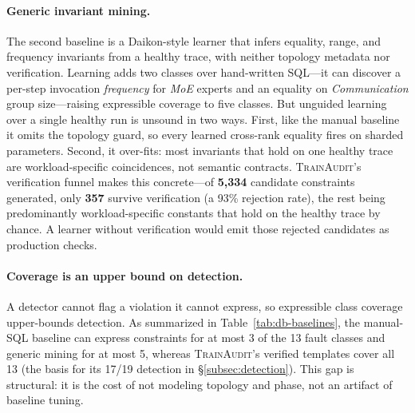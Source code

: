 \paragraph{Generic invariant mining.} The second baseline is a Daikon-style learner that infers equality, range, and frequency invariants from a healthy trace, with neither topology metadata nor verification. Learning adds two classes over hand-written SQL---it can discover a per-step invocation \emph{frequency} for \emph{MoE} experts and an equality on \emph{Communication} group size---raising expressible coverage to five classes. But unguided learning over a single healthy run is unsound in two ways. First, like the manual baseline it omits the topology guard, so every learned cross-rank equality fires on sharded parameters. Second, it over-fits: most invariants that hold on one healthy trace are workload-specific coincidences, not semantic contracts. \textsc{TrainAudit}'s verification funnel makes this concrete---of \textbf{5{,}334} candidate constraints generated, only \textbf{357} survive verification (a 93\% rejection rate), the rest being predominantly workload-specific constants that hold on the healthy trace by chance. A learner without verification would emit those rejected candidates as production checks.

\paragraph{Coverage is an upper bound on detection.} A detector cannot flag a violation it cannot express, so expressible class coverage upper-bounds detection. As summarized in Table~\ref{tab:db-baselines}, the manual-SQL baseline can express constraints for at most 3 of the 13 fault classes and generic mining for at most 5, whereas \textsc{TrainAudit}'s verified templates cover all 13 (the basis for its 17/19 detection in \S\ref{subsec:detection}). This gap is structural: it is the cost of not modeling topology and phase, not an artifact of baseline tuning.

